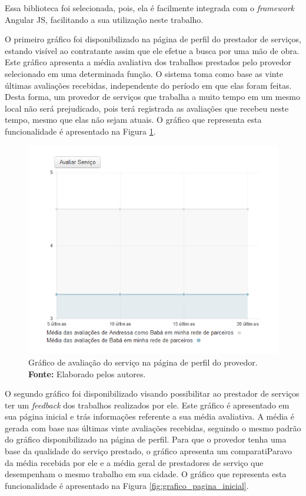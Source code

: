 \par Essa biblioteca foi selecionada, pois, ela é facilmente integrada com o \textit{framework} Angular JS, facilitando a sua utilização neste trabalho. 

\par O primeiro gráfico foi disponibilizado na página de perfil do prestador de serviços, estando visível ao contratante assim que ele efetue a busca por uma mão de obra. Este gráfico apresenta a média avaliativa dos trabalhos prestados pelo provedor selecionado em uma determinada função. O sistema toma como base as vinte últimas avaliações recebidas, independente do período em que elas foram feitas. Desta forma, um provedor de serviços que trabalha a muito tempo em um mesmo local não será prejudicado, pois terá registrada as avaliações que recebeu neste tempo, mesmo que elas não sejam atuais. O gráfico que representa esta funcionalidade é apresentado na Figura \ref{fig:grafico_pagina_perfil}.

\newpage
\begin{figure}[h!]
	\centerline{\includegraphics[scale=0.65]{./imagens/grafico-pagina-perfil.png}}
	\caption[Gráfico de avaliação do serviço na página de perfil do provedor.]
	{Gráfico de avaliação do serviço na página de perfil do provedor. \textbf{Fonte:} Elaborado pelos autores.}
	\label{fig:grafico_pagina_perfil}
\end{figure}

\par O segundo gráfico foi disponibilizado visando possibilitar ao prestador de serviços ter um \textit{feedback} dos trabalhos realizados por ele. Este gráfico é apresentado em sua página inicial e trás informações referente a sua média avaliativa. A média é gerada com base nas últimas vinte avaliações recebidas, seguindo o mesmo padrão do gráfico disponibilizado na página de perfil. Para que o provedor tenha uma base da qualidade do serviço prestado, o gráfico apresenta um comparatiParavo da média recebida por ele e a média geral de prestadores de serviço que desempenham o mesmo trabalho em sua cidade. O gráfico que representa esta funcionalidade é apresentado na Figura \ref{fig:grafico_pagina_inicial}.

